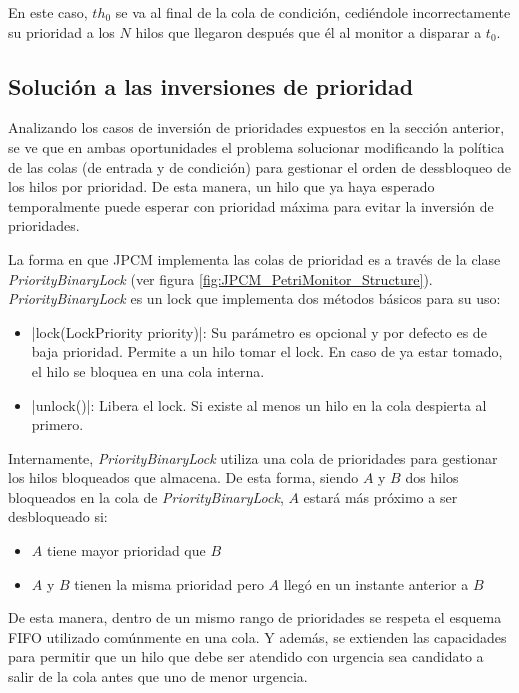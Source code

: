 En este caso, $th_{0}$ se va al final de la cola de condición, cediéndole
incorrectamente su prioridad a los $N$ hilos que llegaron después que él al
monitor a disparar a $t_{0}$.

\subsection{Solución a las inversiones de prioridad}
\label{JPCM_solucion_inv_prioridad}

Analizando los casos de inversión de prioridades expuestos en la sección
anterior, se ve que en ambas oportunidades el problema solucionar modificando
la política de las colas (de entrada y de condición) para gestionar el orden de
dessbloqueo de los hilos por prioridad. De esta manera, un hilo que ya haya
esperado temporalmente puede esperar con prioridad máxima para evitar la
inversión de prioridades.

La forma en que JPCM implementa las colas de prioridad es a través de la clase
\textit{PriorityBinaryLock} (ver figura \ref{fig:JPCM_PetriMonitor_Structure}).
\textit{PriorityBinaryLock} es un lock que implementa dos métodos básicos para
su uso:
\begin{itemize}
  \item {}|lock(LockPriority priority)|: Su parámetro es opcional y por
  defecto es de baja prioridad. Permite a un hilo tomar el lock. En caso de ya
  estar tomado, el hilo se bloquea en una cola interna.
  \item {}|unlock()|: Libera el lock. Si existe al menos un hilo en la
  cola despierta al primero.
\end{itemize}

Internamente, \textit{PriorityBinaryLock} utiliza una cola de prioridades para
gestionar los hilos bloqueados que almacena. De esta forma, siendo $A$ y $B$
dos hilos bloqueados en la cola de \textit{PriorityBinaryLock}, $A$ estará más
próximo a ser desbloqueado si:
\begin{itemize}
  \item $A$ tiene mayor prioridad que $B$
  \item $A$ y $B$ tienen la misma prioridad pero $A$ llegó en un instante
  anterior a $B$
\end{itemize}

De esta manera, dentro de un mismo rango de prioridades se respeta el esquema
FIFO utilizado comúnmente en una cola. Y además, se extienden las capacidades
para permitir que un hilo que debe ser atendido con urgencia sea candidato a
salir de la cola antes que uno de menor urgencia.

